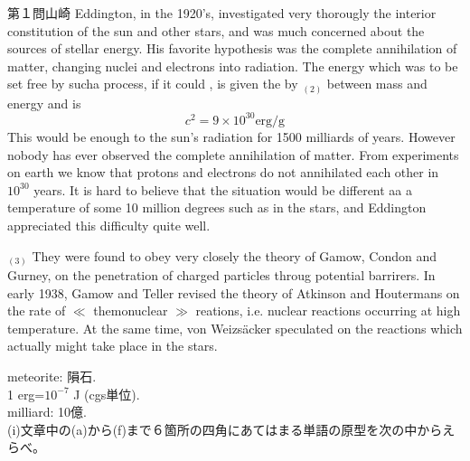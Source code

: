 \documentclass[fleqn]{jbook}
\begin{document}
\begin{question}{第１問}{山崎}
\qquad Eddington, in the 1920's, investigated very thorougly the interior constitution of the sun and other stars, and was much concerned about the sources of stellar energy. His favorite hypothesis was the complete annihilation of matter, changing nuclei and electrons into radiation. The energy which was to be set free by sucha process, if it could , is given the by $_{(2)}$ between mass and energy and is
\begin{equation}
c^2=9\times 10^{30} \text{erg/g}
\end{equation}
This would be enough to  the sun's radiation for 1500 milliards of years. However nobody has ever observed the complete annihilation of matter. From experiments on earth we know that protons and electrons do not annihilated each other in $10^{30}$ years. It is hard to believe that the situation would be different aa a temperature of some 10 million degrees such as  in the stars, and Eddington appreciated this difficulty quite well.


\qquad $_{(3)}$ They were found to obey very closely the theory of Gamow, Condon and Gurney, on the penetration of charged particles throug potential barrirers. In early 1938, Gamow and Teller revised the theory of Atkinson and Houtermans on the rate of $\ll$ themonuclear $\gg$ reations, i.e. nuclear reactions occurring at high temperature. At the same time, von Weizs\"acker speculated on the reactions which actually might take place in the stars.

\hspace{1cm} meteorite: 隕石. \\
\hspace{1cm} 1 erg=$10^{-7}$ J (cgs単位). \\
\hspace{1cm} milliard: 10億. \\

(i)文章中の(a)から(f)まで６箇所の四角にあてはまる単語の原型を次の中からえらべ。


\end{question}
\end{document}
